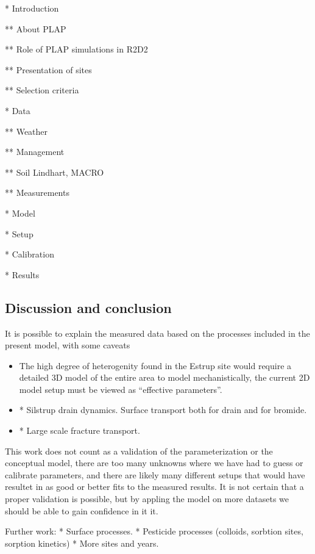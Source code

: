 \documentclass[a4paper]{article}
\begin{document}
\begin{text}
* Introduction

** About PLAP

** Role of PLAP simulations in R2D2

** Presentation of sites

** Selection criteria

* Data

** Weather

** Management

** Soil Lindhart, MACRO

** Measurements

* Model

* Setup

* Calibration

* Results

\end{text}








\begin{text}
\section{Discussion and conclusion}

It is possible to explain the measured data based on the processes
included in the present model, with some caveats
\begin{itemize}
\item The high degree of heterogenity found in the Estrup site would
  require a detailed 3D model of the entire area to model
  mechanistically, the current 2D model setup must be viewed as
  ``effective parameters''.
\item * Silstrup drain dynamics.  Surface transport both for drain and for bromide.
\item * Large scale fracture transport.
\end{itemize}
This work does not count as a validation of the parameterization or
the conceptual model, there are too many unknowns where we have had to
guess or calibrate parameters, and there are likely many different
setups that would have resultet in as good or better fits to the
measured results.  It is not certain that a proper validation is
possible, but by appling the model on more datasets we should be able
to gain confidence in it it.

Further work:
* Surface processes.
* Pesticide processes (colloids, sorbtion sites, sorption kinetics)
* More sites and years.

\end{text}
  
\end{document}
